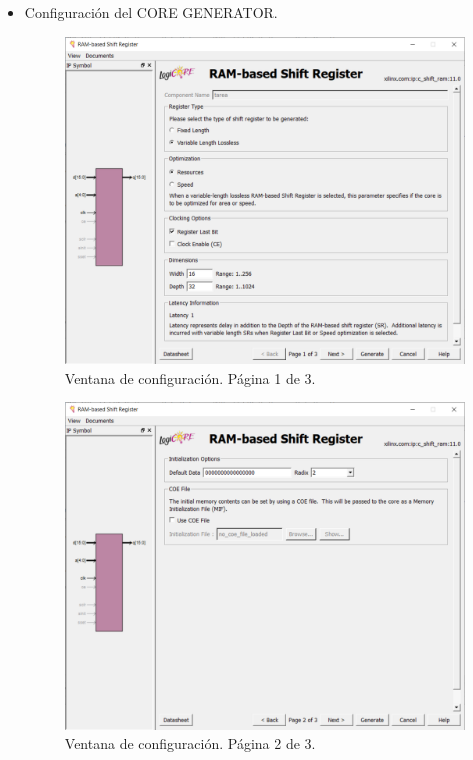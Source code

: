 \documentclass[11pt,a4paper]{article}
\begin{document}
% 
\begin{itemize}
    \item Configuración del CORE GENERATOR.
    
    \begin{figure}[H]
        \centering
        \includegraphics[scale=0.5]{images/core_1.png}
        \caption{Ventana de configuración. Página 1 de 3.}
    \end{figure}
    
    \begin{figure}[H]
        \centering
        \includegraphics[scale=0.5]{images/core_2.png}
        \caption{Ventana de configuración. Página 2 de 3.}
    \end{figure}
    

\end{itemize}
\end{document}
